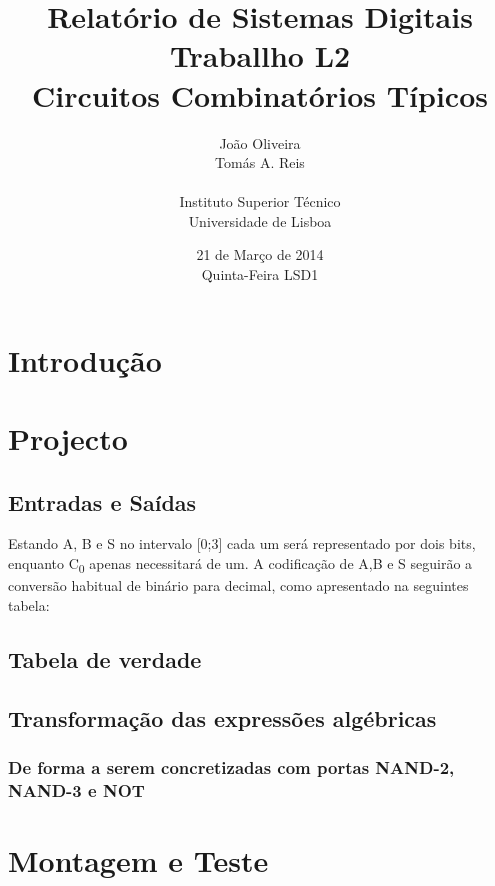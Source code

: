 \documentclass[a4paper,12pt]{article}
\begin{document}
\renewcommand{\sfdefault}{lmss}
\renewcommand{\familydefault}{\sfdefault}
\selectfont

\title{\bf Relatório de Sistemas Digitais \\
Traballho L2\\
Circuitos Combinatórios Típicos}
\author{João Oliveira\\
Tomás A. Reis\\
\\
Instituto Superior Técnico \\
Universidade de Lisboa}
\date{21 de Março de 2014 \\
Quinta-Feira LSD1}
\maketitle

\pagebreak
\section{Introdução}

\section{Projecto}

\subsection{Entradas e Saídas}
Estando A, B e S no intervalo [0;3] cada um será representado por dois bits, enquanto C\textsubscript{0} apenas necessitará de um. A codificação de A,B e S seguirão a conversão habitual de binário para decimal, como apresentado na seguintes tabela:


\subsection{Tabela de verdade}
 
\subsection{Transformação das expressões algébricas}

\subsubsection{De forma a serem concretizadas com portas NAND-2, NAND-3 e NOT}


\section{Montagem e Teste}
\end{document}
